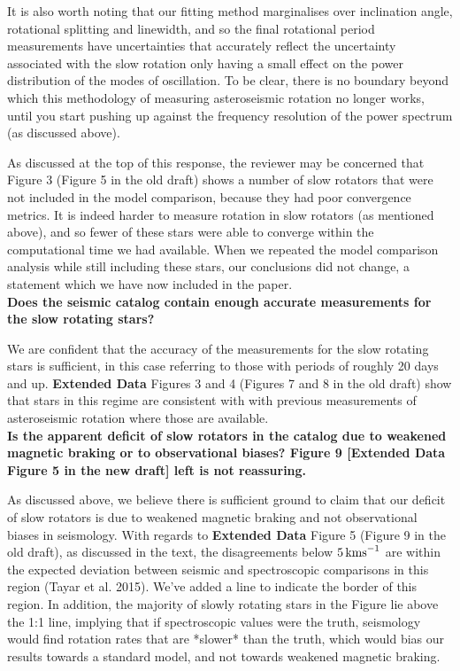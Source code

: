 \documentclass[11pt]{article}
\begin{document}
It is also worth noting that our fitting method marginalises over inclination angle, rotational splitting and linewidth, and so the final rotational period measurements have uncertainties that accurately reflect the uncertainty associated with the slow rotation only having a small effect on the power distribution of the modes of oscillation. To be clear, there is no boundary beyond which this methodology of measuring asteroseismic rotation no longer works, until you start pushing up against the frequency resolution of the power spectrum (as discussed above).

As discussed at the top of this response, the reviewer may be concerned that Figure 3 (Figure 5 in the old draft) shows  a number of slow rotators that were not included in the model comparison, because they had poor convergence metrics. It is indeed harder to measure rotation in slow rotators (as mentioned above), and so fewer of these stars were able to converge within the computational time we had available. When we repeated the model comparison analysis while still including these stars, our conclusions did not change, a statement which we have now included in the paper.\\

\noindent\textbf{Does the seismic catalog contain enough accurate measurements for the slow rotating stars?}

We are confident that the accuracy of the measurements for the slow rotating stars is sufficient, in this case referring to those with periods of roughly 20 days and up. \textbf{Extended Data} Figures 3 and 4 (Figures 7 and 8 in the old draft) show that stars in this regime are consistent with with previous measurements of asteroseismic rotation where those are available.\\

\noindent\textbf{Is the apparent deficit of slow rotators in the catalog due to weakened magnetic braking or to observational biases? Figure 9 [\textbf{Extended Data} Figure 5 in the new draft] left is not reassuring.}

As discussed above, we believe there is sufficient ground to claim that our deficit of slow rotators is due to weakened magnetic braking and not observational biases in seismology. With regards to \textbf{Extended Data} Figure 5 (Figure 9 in the old draft), as discussed in the text, the disagreements below $5\,  \rm{kms}^{-1}$ are within the expected deviation between seismic and spectroscopic comparisons in this region (Tayar et al. 2015). We’ve added a line to indicate the border of this region. In addition, the majority of slowly rotating stars in the Figure lie above the 1:1 line, implying that if spectroscopic values were the truth, seismology would find rotation rates that are *slower* than the truth, which would bias our results towards a standard model, and not towards weakened magnetic braking.
\end{document}
